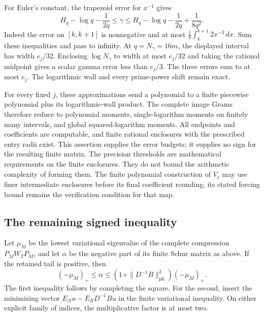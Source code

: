 For Euler's constant, the trapezoid error for $x^{-1}$ gives
\begin{equation}
 H_q-\log q-\frac1{2q}\le\gamma\le
 H_q-\log q-\frac1{2q}+\frac1{8q^2}.
 \label{eq:cofinal-gamma-trapezoid}
\end{equation}
Indeed the error on $[k,k+1]$ is nonnegative and at most
$\frac18\int_k^{k+1}2x^{-3}\,dx$.  Sum these inequalities and
pass to infinity.  At $q=N_\gamma=16m$, the displayed interval
has width $e_j/32$.
Enclosing $\log N_\gamma$ to width at most $e_j/32$ and taking
the rational midpoint gives a scalar gamma error less than
$e_j/3$. The three errors sum to at most $e_j$.
The logarithmic wall and every prime-power shift remain exact.

For every fixed $j$, these approximations send a polynomial to
a finite piecewise polynomial plus its logarithmic-wall product.
The complete image Grams therefore reduce to polynomial moments,
single-logarithm moments on finitely many intervals, and global
squared-logarithm moments. All endpoints and coefficients are
computable, and finite rational enclosures with the prescribed
entry radii exist. This assertion supplies the error budgets;
it supplies no sign for the resulting finite matrix.
The precision thresholds are mathematical requirements on the
finite enclosures. They do not bound the arithmetic complexity of
forming them. The finite polynomial construction of $V_j$ may
use finer intermediate enclosures before its final coefficient
rounding; its stated forcing bound remains the verification
condition for that map.

\subsection{The remaining signed inequality}

Let $\mu_M$ be the lowest variational eigenvalue of the complete
compression $P_MW_TP_M$, and let $\alpha$ be the negative part
of its finite Schur matrix as above. If the retained tail is
positive, then
\begin{equation}\label{eq:cofinal-alpha-variational}
 (-\mu_M)_+\le\alpha
 \le(1+\|D^{-1}B\|_{\mathrm{ph}}^2)(-\mu_M)_+.
\end{equation}
The first inequality follows by completing the square. For the
second, insert the minimizing vector
$E_Nu-E_RD^{-1}Bu$ in the finite variational inequality.
On either explicit family of indices, the multiplicative factor
is at most two.

